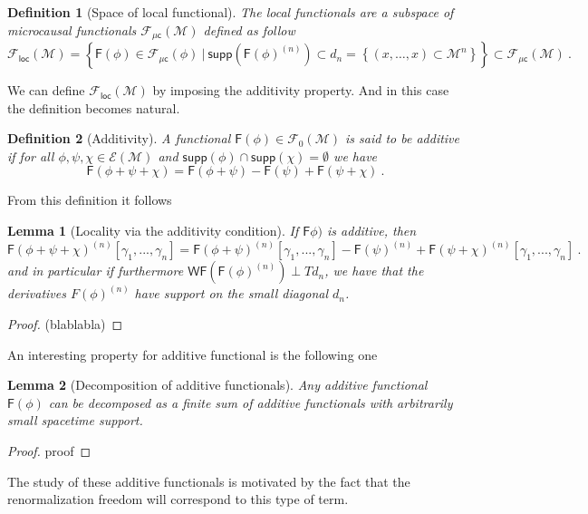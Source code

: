 \documentclass[10pt]{book}
\newcommand{\supp}{\mathsf{supp}}
\newcommand{\WF}{\mathsf{WF}}
\newcommand{\Ecal}{\mathcal{E}}
\newcommand{\Fcal}{\mathcal{F}}
\newcommand{\Mcal}{\mathcal{M}}
\newcommand{\Fsf}{\mathsf{F}}
\newcommand{\csf}{\mathsf{c}}
\theoremstyle{break}
\newtheorem{lemma}{Lemma}
\newtheorem{definition}{Definition}
\newtheorem{proof}{Proof}
\begin{document}
%
\begin{definition}[Space of local functional]
The local functionals are a subspace of microcausal functionals $\Fcal_{\mathsf{\mu c}}(\Mcal)$ defined as follow
%
\begin{equation*}
\Fcal_{\mathsf{loc}}(\Mcal) = \left\{ \Fsf(\phi) \in \Fcal_{\mu\csf}(\phi) \ \bigg| \ \supp\left(\Fsf(\phi)^{(n)}\right) \subset d_n = \left\{ (x,\dots,x) \subset \Mcal^n \right\} \right\} \subset \Fcal_{\mu\csf}(\Mcal) \ .
\end{equation*}
%
\end{definition}
%
We can define $\Fcal_{\mathsf{loc}}(\Mcal)$ by imposing the additivity property. And in this case the definition %
becomes natural.
%
\begin{definition}[Additivity]
A functional $\Fsf(\phi) \in \Fcal_0(\Mcal)$ is said to be additive if for all $\phi, \psi, \chi \in \Ecal(\Mcal)$ and $\supp(\phi) \cap \supp(\chi) = \emptyset$ we have 
%
\begin{equation*}
\Fsf(\phi + \psi + \chi) = \Fsf(\phi + \psi) - \Fsf(\psi) + \Fsf(\psi + \chi) \ . 
\end{equation*}
%
\end{definition}
%
%
From this definition it follows
%
\begin{lemma}[Locality via the additivity condition]
If $\Fsf\phi)$ is additive, then
\begin{equation*}
\Fsf(\phi + \psi + \chi)^{(n)}[\gamma_1,...,\gamma_n] = \Fsf(\phi + \psi)^{(n)}[\gamma_1,...,\gamma_n] - \Fsf(\psi)^{(n)} + \Fsf(\psi + \chi)^{(n)}[\gamma_1,...,\gamma_n] \ . 
\end{equation*}
and in particular if furthermore $\WF\left(\Fsf(\phi)^{(n)}\right) \perp Td_n$, we have that the derivatives $F(\phi)^{(n)}$ have support on the small diagonal $d_n$. 
\end{lemma}
%
\begin{proof}
(blablabla)
\end{proof}

%
An interesting property for additive functional is the following one %
%
\begin{lemma}[Decomposition of additive functionals]
Any additive functional $\Fsf(\phi)$ can be decomposed as a finite sum of additive functionals with arbitrarily small spacetime support.
\end{lemma}
%
\begin{proof}
proof
\end{proof}
%
The study of these additive functionals is motivated by the fact that the renormalization freedom will correspond to this type of term.
\end{document}
